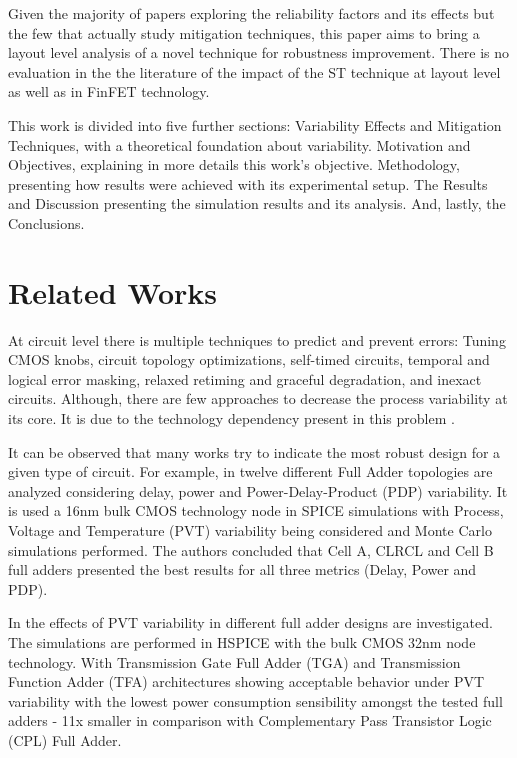 \documentclass[ecp,tc, english]{iiufrgs}
\begin{document}
Given the majority of papers exploring the reliability factors and its effects but the few that actually study mitigation techniques, this paper aims to bring a layout level analysis of a novel technique for robustness improvement. There is no evaluation in the the literature of the impact of the ST technique at layout level as well as in FinFET technology.

This work is divided into five further sections: Variability Effects and Mitigation Techniques, with a theoretical foundation about variability. Motivation and Objectives, explaining in more details this work’s objective. Methodology, presenting how results were achieved with its experimental setup. The Results and Discussion presenting the simulation results and its analysis. And, lastly, the Conclusions.

\section{Related Works}

At circuit level there is multiple techniques to predict and prevent errors: Tuning CMOS knobs, circuit topology optimizations, self-timed circuits, temporal and logical error masking, relaxed retiming and graceful degradation, and inexact circuits. Although, there are few approaches to decrease the process variability at its core. It is due to the technology dependency present in this problem \cite{rahimi2016variability}.

It can be observed that many works try to indicate the most robust design for a given type of circuit. For example, in \cite{dokania2013investigation} twelve different Full Adder topologies are analyzed considering delay, power and Power-Delay-Product (PDP) variability. It is used a 16nm bulk CMOS technology node in SPICE simulations with Process, Voltage and Temperature (PVT) variability being considered and Monte Carlo simulations performed. The authors concluded that Cell A, CLRCL and Cell B full adders presented the best results for all three metrics (Delay, Power and PDP).

In \cite{ames2016investigating} the effects of PVT variability in different full adder designs are investigated. The simulations are performed in HSPICE with the bulk CMOS 32nm node technology. With Transmission Gate Full Adder (TGA) and Transmission Function Adder (TFA) architectures showing acceptable behavior under PVT variability with the lowest power consumption sensibility amongst the tested full adders - 11x smaller in comparison with Complementary Pass Transistor Logic (CPL) Full Adder.
\end{document}
